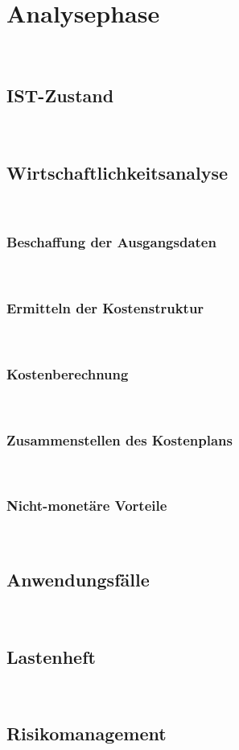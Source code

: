 \documentclass[11pt,toc=sectionentrywithoutdots, headheight=44pt, headings=optiontoheadandtoc, hyperfootnotes=false]{scrartcl}
\begin{document}
\section{Analysephase}
\blindtext\

\subsection{IST-Zustand}
\blindtext\

\subsection{Wirtschaftlichkeitsanalyse}
\blindtext\

\subsubsection{Beschaffung der Ausgangsdaten}
\blindtext\

\subsubsection{Ermitteln der Kostenstruktur}
\blindtext\

\subsubsection{Kostenberechnung}
\blindtext\

\subsubsection{Zusammenstellen des Kostenplans}
\blindtext\

\subsubsection{Nicht-monetäre Vorteile}
\blindtext\

\subsection{Anwendungsfälle}
\blindtext\

\subsection{Lastenheft}
\blindtext\

\subsection{Risikomanagement}
\blindtext\
\end{document}
